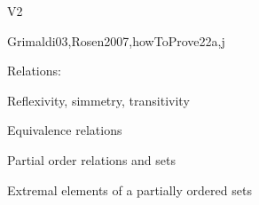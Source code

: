 \begin{syllabus}
\begin{competences}{V2}
    \item {}
    \item {}
\end{competences}

\begin{unit}{\DSSetsRelationsandFunctions}{}{Grimaldi03,Rosen2007,howToProve}{22}{a,j}
\begin{topics}
    \item \DSSetsRelationsandFunctionsTopicSets
    \item Relations:
        \begin{subtopics}
            \item Reflexivity, simmetry, transitivity
            \item Equivalence relations
            \item Partial order relations and sets
            \item Extremal elements of a partially ordered sets
        \end{subtopics}
    \item \DSSetsRelationsandFunctionsTopicFunctions
\end{topics}
\begin{learningoutcomes}
    \item \DSSetsRelationsandFunctionsLOExplainWith [\Assessment]
    \item \DSSetsRelationsandFunctionsLOPerformThe [\Assessment]
    \item \DSSetsRelationsandFunctionsLORelate [\Assessment]
\end{learningoutcomes}
\end{unit}


\end{syllabus}
